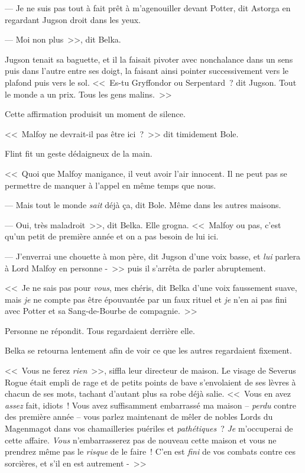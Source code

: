 --- Je ne suis pas tout à fait prêt à m'agenouiller devant Potter, dit Astorga en regardant Jugson droit dans les yeux.

--- Moi non plus~>>, dit Belka.

Jugson tenait sa baguette, et il la faisait pivoter avec nonchalance dans un sens puis dans l'autre entre ses doigt, la faisant ainsi pointer successivement vers le plafond puis vers le sol. <<~Es-tu Gryffondor ou Serpentard~? dit Jugson. Tout le monde a un prix. Tous les gens malins.~>>

Cette affirmation produisit un moment de silence.

<<~Malfoy ne devrait-il pas être ici~?~>> dit timidement Bole.

Flint fit un geste dédaigneux de la main.

<<~Quoi que Malfoy manigance, il veut avoir l'air innocent. Il ne peut pas se permettre de manquer à l'appel en même temps que nous.

--- Mais tout le monde \emph{sait} déjà ça, dit Bole. Même dans les autres maisons.

--- Oui, très maladroit~>>, dit Belka. Elle grogna. <<~Malfoy ou pas, c'est qu'un petit de première année et on a pas besoin de lui ici.

--- J'enverrai une chouette à mon père, dit Jugson d'une voix basse, et \emph{lui} parlera à Lord Malfoy en personne -~>> puis il s'arrêta de parler abruptement.

<<~Je ne sais pas pour \emph{vous}, mes chéris, dit Belka d'une voix faussement suave, mais \emph{je} ne compte pas être épouvantée par un faux rituel et \emph{je} n'en ai pas fini avec Potter et sa Sang-de-Bourbe de compagnie.~>>

Personne ne répondit. Tous regardaient derrière elle.

Belka se retourna lentement afin de voir ce que les autres regardaient fixement.

<<~Vous ne ferez \emph{rien}~>>, siffla leur directeur de maison. Le visage de Severus Rogue était empli de rage et de petits points de bave s'envolaient de ses lèvres à chacun de ses mots, tachant d'autant plus sa robe déjà salie. <<~Vous en avez \emph{assez} fait, idiots~! Vous avez suffisamment embarrassé ma maison -- \emph{perdu} contre des première année -- vous parlez maintenant de mêler de nobles Lords du Magenmagot dans vos chamailleries puériles et \emph{pathétiques}~? \emph{Je} m'occuperai de cette affaire. \emph{Vous} n'embarrasserez pas de nouveau cette maison et vous ne prendrez même pas le \emph{risque} de le faire~! C'en est \emph{fini} de vos combats contre ces sorcières, et s'il en est autrement -~>>

